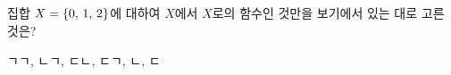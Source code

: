 \hspace*{2mm}\begin{minipage}[t]{\dimexpr\linewidth-2mm\relax}\vspace{0pt}
집합 $X=\{0,\mkern3mu 1,\mkern3mu 2\}$에 대하여 $X$에서 $X$로의 함수인 것만을 보기에서 있는 대로 고른 것은? 
\begin{choices32}{ㄱ}{ㄱ, ㄴ}{ㄱ, ㄷ}{ㄴ, ㄷ}{ㄱ, ㄴ, ㄷ}\end{choices32}\end{minipage}

